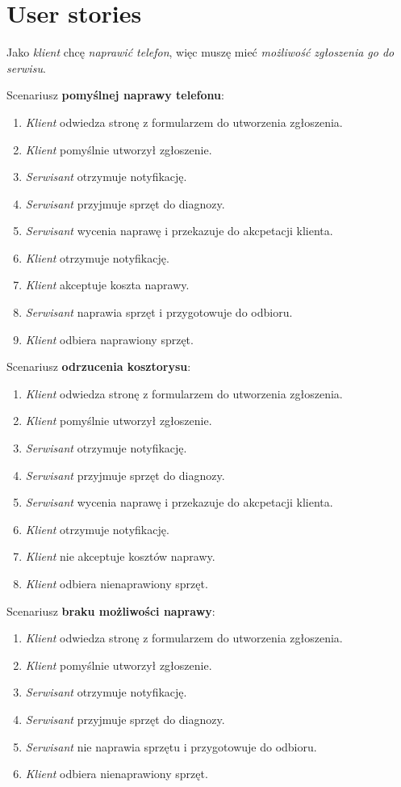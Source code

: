 \documentclass[11pt,a4paper]{article}
\begin{document}
\section{User stories}
Jako \textit{klient} chcę \textit{naprawić telefon}, więc muszę mieć \textit{możliwość zgłoszenia go do
serwisu}.
\bigskip
\par Scenariusz \textbf{pomyślnej naprawy telefonu}:
\begin{enumerate}
\item{\textit{Klient} odwiedza stronę z formularzem do utworzenia zgłoszenia.}
\item{\textit{Klient} pomyślnie utworzył zgłoszenie.}
\item{\textit{Serwisant} otrzymuje notyfikację.}
\item{\textit{Serwisant} przyjmuje sprzęt do diagnozy.}
\item{\textit{Serwisant} wycenia naprawę i przekazuje do akcpetacji klienta.}
\item{\textit{Klient} otrzymuje notyfikację.}
\item{\textit{Klient} akceptuje koszta naprawy.}
\item{\textit{Serwisant} naprawia sprzęt i przygotowuje do odbioru.}
\item{\textit{Klient} odbiera naprawiony sprzęt.}
\end{enumerate}
\bigskip
\par Scenariusz \textbf{odrzucenia kosztorysu}:
\begin{enumerate}
\item{\textit{Klient} odwiedza stronę z formularzem do utworzenia zgłoszenia.}
\item{\textit{Klient} pomyślnie utworzył zgłoszenie.}
\item{\textit{Serwisant} otrzymuje notyfikację.}
\item{\textit{Serwisant} przyjmuje sprzęt do diagnozy.}
\item{\textit{Serwisant} wycenia naprawę i przekazuje do akcpetacji klienta.}
\item{\textit{Klient} otrzymuje notyfikację.}
\item{\textit{Klient} nie akceptuje kosztów naprawy.}
\item{\textit{Klient} odbiera nienaprawiony sprzęt.}
\end{enumerate}
\bigskip
\par Scenariusz \textbf{braku możliwości naprawy}:
\begin{enumerate}
\item{\textit{Klient} odwiedza stronę z formularzem do utworzenia zgłoszenia.}
\item{\textit{Klient} pomyślnie utworzył zgłoszenie.}
\item{\textit{Serwisant} otrzymuje notyfikację.}
\item{\textit{Serwisant} przyjmuje sprzęt do diagnozy.}
\item{\textit{Serwisant} nie naprawia sprzętu i przygotowuje do odbioru.}
\item{\textit{Klient} odbiera nienaprawiony sprzęt.}
\end{enumerate}
\end{document}
